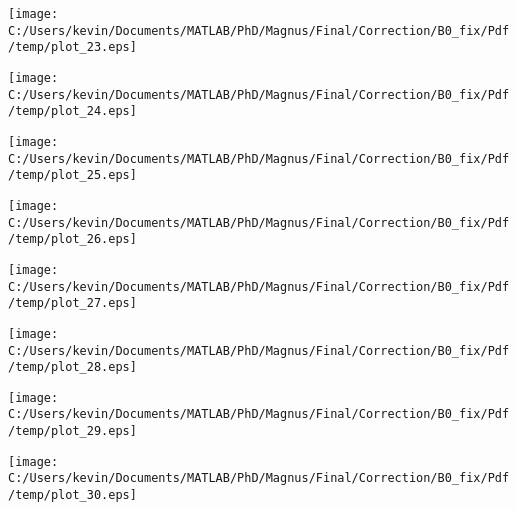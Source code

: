 \begin{landscape}
\texttt{[image: C:/Users/kevin/Documents/MATLAB/PhD/Magnus/Final/Correction/B0\_fix/Pdf/temp/plot\_23.eps]}
\end{landscape}
\begin{landscape}
\texttt{[image: C:/Users/kevin/Documents/MATLAB/PhD/Magnus/Final/Correction/B0\_fix/Pdf/temp/plot\_24.eps]}
\end{landscape}
\begin{landscape}
\texttt{[image: C:/Users/kevin/Documents/MATLAB/PhD/Magnus/Final/Correction/B0\_fix/Pdf/temp/plot\_25.eps]}
\end{landscape}
\begin{landscape}
\texttt{[image: C:/Users/kevin/Documents/MATLAB/PhD/Magnus/Final/Correction/B0\_fix/Pdf/temp/plot\_26.eps]}
\end{landscape}
\begin{landscape}
\texttt{[image: C:/Users/kevin/Documents/MATLAB/PhD/Magnus/Final/Correction/B0\_fix/Pdf/temp/plot\_27.eps]}
\end{landscape}
\begin{landscape}
\texttt{[image: C:/Users/kevin/Documents/MATLAB/PhD/Magnus/Final/Correction/B0\_fix/Pdf/temp/plot\_28.eps]}
\end{landscape}
\begin{landscape}
\texttt{[image: C:/Users/kevin/Documents/MATLAB/PhD/Magnus/Final/Correction/B0\_fix/Pdf/temp/plot\_29.eps]}
\end{landscape}
\begin{landscape}
\texttt{[image: C:/Users/kevin/Documents/MATLAB/PhD/Magnus/Final/Correction/B0\_fix/Pdf/temp/plot\_30.eps]}
\end{landscape}
